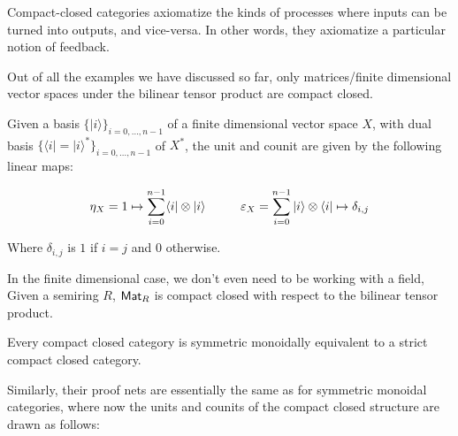 Compact-closed categories axiomatize the kinds of processes where inputs can be turned into outputs, and vice-versa.  In other words, they axiomatize a particular notion of feedback.


\begin{example}
Out of all the examples we have discussed so far, only matrices/finite dimensional vector spaces under the bilinear tensor product are compact closed.

Given a basis $\{ | i \rangle \}_{i=0,\ldots, n-1}$ of a finite dimensional vector space $X$, with dual basis $\{\langle i| = |i \rangle^* \}_{i=0,\ldots, n-1}$ of $X^*$, the unit and counit are given by the following linear maps:

$$
\eta_X = 1 \mapsto \sum_{i=0}^{n-1} \langle i| \otimes | i \rangle \hspace*{1cm}\epsilon_X = \sum_{i=0}^{n-1} | i \rangle\otimes \langle i| \mapsto \delta_{i,j}
$$

Where $\delta_{i,j}$ is $1$ if $i=j$ and $0$ otherwise.

In the finite dimensional case, we don't even need to be working with a field, Given a semiring $R$, $\Mat_R$ is compact closed with respect to the bilinear tensor product.
\end{example}

\begin{theorem}
Every compact closed category is  symmetric monoidally equivalent to a strict compact closed category. 
\end{theorem}

Similarly, their proof nets are essentially the same as for symmetric monoidal categories, where now the units and counits of the compact closed structure are drawn as follows:

